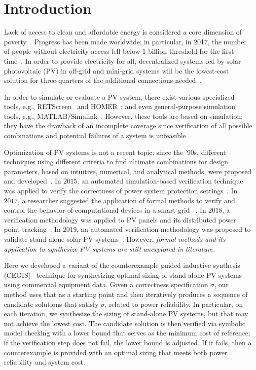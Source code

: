\documentclass[runningheads]{llncs}
\begin{document}
\section{Introduction}

Lack of access to clean and affordable energy is considered a core dimension of poverty~\cite{Hussein2012}. Progress has been made worldwide; in particular, in 2017, the number of people without electricity access fell below $1$ billion threshold for the first time~\cite{IEAweo2018}. In order to provide electricity for all, decentralized systems led by solar photovoltaic (PV) in off-grid and mini-grid systems will be the lowest-cost solution for three-quarters of the additional connections needed~\cite{Hussein2012}. 

In order to simulate or evaluate a PV system, there exist various specialized tools, e.g., RETScreen~\cite{Pradhan} and HOMER~\cite{Swarnkar}; and even general-purpose simulation tools, e.g., MATLAB/Simulink~\cite{Gow1999}. 
 However, these tools are based on simulation; they have the drawback of an incomplete coverage since verification of all possible combinations and potential failures of a system is unfeasible~\cite{ClarkeHV18}. 

Optimization of PV systems is not a recent topic; since the '90s, different techniques using different criteria to find ultimate combinations for design parameters, based on intuitive, numerical, and analytical methods, were proposed and developed~\cite{Alsadi2018}. In $2015$, an automated simulation-based verification technique was applied to verify the correctness of power system protection settings~\cite{Sengupta2015}. In $2017$, a researcher suggested the application of formal methods to verify and control the behavior of computational devices in a smart grid ~\cite{Abate2017}. In $2018$, a verification methodology was applied to PV panels and its distributed power point tracking~\cite{Driouich2018}. In $2019$, an automated verification methodology was proposed to validate stand-alone solar PV systems~\cite{TrindadeCordeiro19}. However, \textit{formal methods and its application to synthesize PV systems are still unexplored in literature}.

Here we developed a variant of the counterexample guided inductive synthesis (CEGIS)~\cite{DBLP:conf/asplos/Solar-LezamaTBSS06} technique for synthesizing optimal sizing of stand-alone PV systems using commercial equipment data. Given a correctness specification $\sigma$, our method uses that as a starting point and then iteratively produces a sequence of candidate solutions that satisfy $\sigma$, related to power reliability. In particular, on each iteration, we synthesize the sizing of stand-alone PV systems, but that may not achieve the lowest cost. The candidate solution is then verified via symbolic model checking with a lower bound that serves as the minimum cost of reference; if the verification step does not fail, the lower bound is adjusted. If it fails, then a counterexample is provided with an optimal sizing that meets both power reliability and system cost. 
\end{document}
